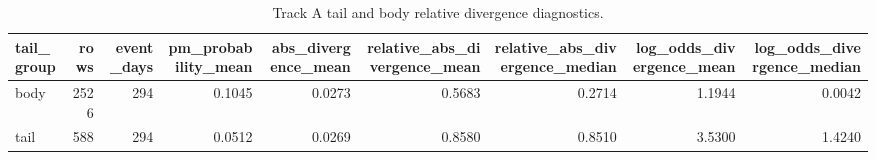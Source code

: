\begin{table}
\caption{Track A tail and body relative divergence diagnostics.}
\label{tab:trackA_tail_relative_wedge}
\begin{tabular}{lrrrrrrrr}
\toprule
tail\_group & rows & event\_days & pm\_probability\_mean & abs\_divergence\_mean & relative\_abs\_divergence\_mean & relative\_abs\_divergence\_median & log\_odds\_divergence\_mean & log\_odds\_divergence\_median \\
\midrule
body & 2526 & 294 & 0.1045 & 0.0273 & 0.5683 & 0.2714 & 1.1944 & 0.0042 \\
tail & 588 & 294 & 0.0512 & 0.0269 & 0.8580 & 0.8510 & 3.5300 & 1.4240 \\
\bottomrule
\end{tabular}
\end{table}
